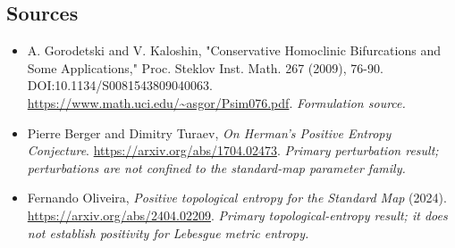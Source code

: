 \documentclass[11pt]{article}
\begin{document}
\subsection{Sources}
\begin{itemize}
\item[S1]A. Gorodetski and V. Kaloshin, "Conservative Homoclinic Bifurcations and Some Applications," Proc. Steklov Inst. Math. 267 (2009), 76-90. DOI:10.1134/S0081543809040063.
\url{https://www.math.uci.edu/~asgor/Psim076.pdf}.
\textit{Formulation source.}
\item[E1]Pierre Berger and Dimitry Turaev, \emph{On Herman's Positive Entropy Conjecture}.
\url{https://arxiv.org/abs/1704.02473}.
\textit{Primary perturbation result; perturbations are not confined to the standard-map parameter family.}
\item[E2]Fernando Oliveira, \emph{Positive topological entropy for the Standard Map} (2024).
\url{https://arxiv.org/abs/2404.02209}.
\textit{Primary topological-entropy result; it does not establish positivity for Lebesgue metric entropy.}
\end{itemize}
\end{document}
